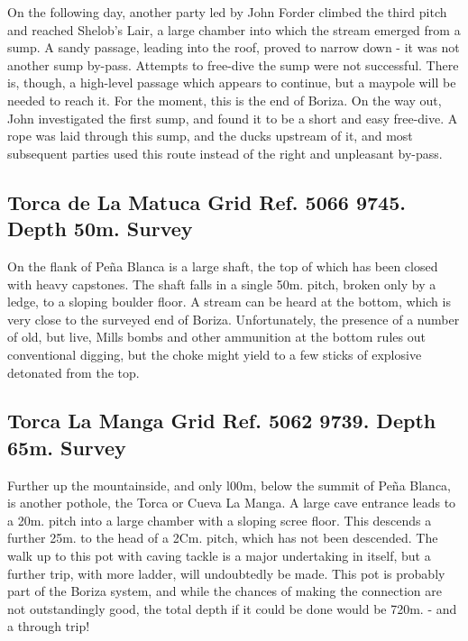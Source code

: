 \documentclass[11pt, a4paper, twoside]{memoir}
\begin{document}
On the following day, another party led by John Forder climbed the third pitch and reached Shelob's Lair, a large chamber into which the stream emerged from a sump. A sandy passage, leading into the roof, proved to narrow down - it was not another sump by-pass. Attempts to free-dive the sump were not successful. There is, though, a high-level passage which appears to continue, but a maypole will be needed to reach it. For the moment, this is the end of Boriza. On the way out, John investigated the first sump, and found it to be a short and easy free-dive. A rope was laid through this sump, and the ducks upstream of it, and most subsequent parties used this route instead of the right and unpleasant by-pass.



\subsection*{Torca de La Matuca Grid Ref. 5066 9745. Depth 50m. Survey}

On the flank of Peña Blanca is a large shaft, the top of which has been closed with heavy capstones. The shaft falls in a single 50m. pitch, broken only by a ledge, to a sloping boulder floor. A stream can be heard at the bottom, which is very close to the surveyed end of Boriza. Unfortunately, the presence of a number of old, but live, Mills bombs and other ammunition at the bottom rules out conventional digging, but the choke might yield to a few sticks of explosive detonated from the top.



\subsection*{Torca La Manga Grid Ref. 5062 9739. Depth 65m. Survey}

Further up the mountainside, and only l00m, below the summit of Peña Blanca, is another pothole, the Torca or Cueva La Manga. A large cave entrance leads to a 20m. pitch into a large chamber with a sloping scree floor. This descends a further 25m. to the head of a 2Cm. pitch, which has not been descended. The walk up to this pot with caving tackle is a major undertaking in itself, but a further trip, with more ladder, will undoubtedly be made. This pot is probably part of the Boriza system, and while the chances of making the connection are not outstandingly good, the total depth if it could be done would be 720m. - and a through trip!
\end{document}
